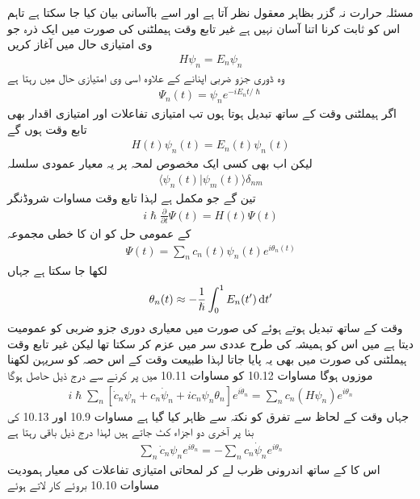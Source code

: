 مسئلہ حرارت نہ گزر بظاہر معقول نظر آتا ہے اور اسے باآسانی بیان کیا جا سکتا ہے تاہم اس کو ثابت کرنا اتنا آسان نہیں ہے غیر تابع وقت ہيملٹنی کی صورت میں ایک ذرہ جو  وی امتیازی حال  میں آغاز کریں 
\begin{align}
H \psi_n = E_n \psi_n
\end{align}
 وہ ڈوری جزو ضربی اپنانے کے علاوہ اسی  وی امتیازی حال میں رہتا ہے 
\begin{align}
\Psi_n (t) = \psi_n e^{-i E_n t/ \hslash}
\end{align}
اگر ہيملٹنی وقت کے ساتھ تبدیل ہوتا ہوں تب امتیازی تفاعلات اور امتیازی اقدار بھی تابع وقت ہوں گے 
\begin{align}
H(t) \psi_n (t) = E_n (t) \psi_n (t)
\end{align}
لیکن اب بھی کسی ایک مخصوص لمحہ پر یہ معیار عمودی سلسلہ 
\begin{align}
\langle \psi_n (t) | \psi_m (t) \rangle \delta_{nm} 
\end{align}
تین گے جو مکمل ہے لہذا تابع وقت مساوات شروڈنگر 
\begin{align}
i \hslash \frac{\partial}{\partial t} \Psi (t) = H (t) \Psi (t)
\end{align}
کے عمومی حل کو ان کا خطی مجموعہ 
\begin{align}
\Psi (t) = \sum_n c_n (t) \psi_n (t) e^{i \theta_n (t)}
\end{align}
لکھا جا سکتا ہے جہاں 
\begin{align}
\theta_n (t) \approx - \frac{1}{\hslash} \int_0^1 E_n (t') \dif t'
\end{align}
وقت کے ساتھ تبدیل ہوتے ہوئے  کی صورت میں معیاری دوری جزو ضربی کو عمومیت دیتا ہے میں اس کو ہمیشہ کی طرح عددی سر  میں عزم کر سکتا تھا لیکن غیر تابع وقت ہيملٹنی کی صورت میں بھی یہ پایا جاتا لہذا طبیعت وقت کے اس حصہ کو سریہن لکھنا موزوں ہوگا مساوات 10.12 کو مساوات 10.11 میں پر کرنے سے درج ذیل حاصل ہوگا 
\begin{align}
i \hslash \sum_n [\dot{c}_n \psi_n + c_n \dot{\psi}_n + i c_n \psi_n \theta_n] e^{i \dot{\theta}_n} = \sum_n c_n (H \psi_n) e^{i \theta_n} 
\end{align}
جہاں وقت کے لحاظ سے تفرق کو نکتہ سے ظاہر کیا گیا ہے مساوات 10.9 اور 10.13 کی بنا پر آخری دو اجزاء کٹ جاتے ہیں لہذا درج ذیل باقی رہتا ہے 
\begin{align}
\sum_n \dot{c}_n \psi_n e^{i \theta_n} = - \sum_n c_n \dot{\psi}_n e^{i \theta_n}
\end{align}
اس کا  کے ساتھ اندرونی ظرب لے کر لمحاتی امتیازی تفاعلات کی معیار ہمودیت مساوات 10.10 بروئے کار لاتے ہوئے 
